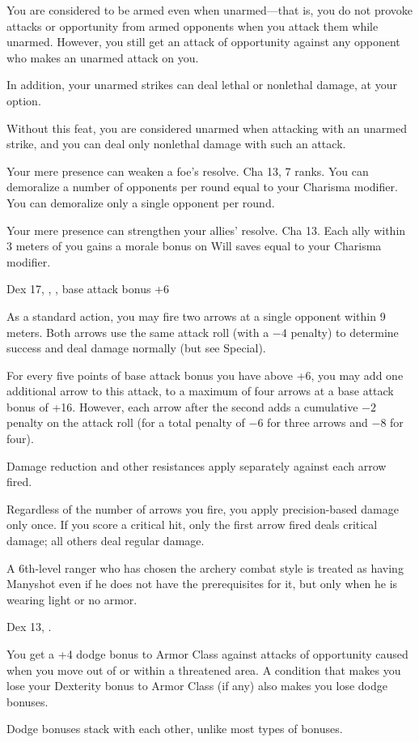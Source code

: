 {}
{You are considered to be armed even when unarmed---that is, you do not provoke attacks or opportunity from armed opponents when you attack them while unarmed. However, you still get an attack of opportunity against any opponent who makes an unarmed attack on you.

In addition, your unarmed strikes can deal lethal or nonlethal damage, at your option.}
{Without this feat, you are considered unarmed when attacking with an unarmed strike, and you can deal only nonlethal damage with such an attack.}{}

{Your mere presence can weaken a foe's resolve.}
{Cha 13,  7 ranks.}
{You can demoralize a number of opponents per round equal to your Charisma modifier.}
{You can demoralize only a single opponent per round.}{}

{Your mere presence can strengthen your allies' resolve.}
{Cha 13.}
{Each ally within 3 meters of you gains a morale bonus on Will saves equal to your Charisma modifier.}{}{}

{}
{Dex 17, , , base attack bonus +6}
{As a standard action, you may fire two arrows at a single opponent within 9 meters. Both arrows use the same attack roll (with a $-4$ penalty) to determine success and deal damage normally (but see Special).

For every five points of base attack bonus you have above +6, you may add one additional arrow to this attack, to a maximum of four arrows at a base attack bonus of +16. However, each arrow after the second adds a cumulative $-2$ penalty on the attack roll (for a total penalty of $-6$ for three arrows and $-8$ for four).

Damage reduction and other resistances apply separately against each arrow fired.}{}
{Regardless of the number of arrows you fire, you apply precision-based damage only once. If you score a critical hit, only the first arrow fired deals critical damage; all others deal regular damage.

A 6th-level ranger who has chosen the archery combat style is treated as having Manyshot even if he does not have the prerequisites for it, but only when he is wearing light or no armor.}

{Dex 13, .}
{You get a +4 dodge bonus to Armor Class against attacks of opportunity caused when you move out of or within a threatened area. A condition that makes you lose your Dexterity bonus to Armor Class (if any) also makes you lose dodge bonuses.

Dodge bonuses stack with each other, unlike most types of bonuses.}

